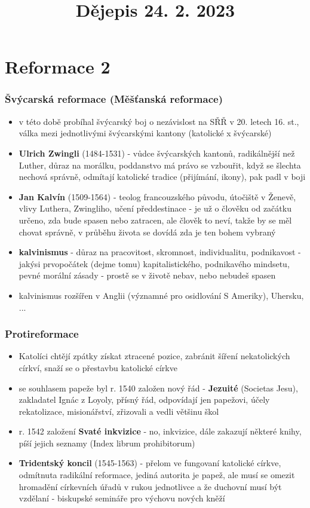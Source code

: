 \documentclass{article}
\title{\vspace{-2cm}Dějepis 24. 2. 2023\vspace{-1.7cm}}
\date{}
\author{}
\begin{document}
\maketitle

\part{Reformace 2}

\section{Švýcarská reformace (Měšťanská reformace)}
\begin{itemize}
  \item v této době probíhal švýcarský boj o nezávislost na SŘŘ v 20. letech 16. st., válka mezi jednotlivými švýcarskými kantony (katolické x švýcarské)
  \item \textbf{Ulrich Zwingli} (1484-1531) - vůdce švýcarských kantonů, radikálnější než Luther, důraz na morálku, poddanstvo má právo se vzbouřit, když se šlechta nechová správně, odmítají katolické tradice (přijímání, ikony), pak padl v boji
  \item \textbf{Jan Kalvín} (1509-1564) - teolog francouzského původu, útočiště v Ženevě, vlivy Luthera, Zwingliho, učení předdestinace - je už o člověku od začátku určeno, zda bude spasen nebo zatracen, ale člověk to neví, takže by se měl chovat správně, v průběhu života se dovídá zda je ten bohem vybraný
  \item \textbf{kalvinismus} - důraz na pracovitost, skromnost, individualitu, podnikavost - jakýsi prvopočátek (dejme tomu) kapitalistického, podnikavého mindsetu, pevné morální zásady - prostě se v životě nebav, nebo nebudeš spasen
  \item kalvinismus rozšířen v Anglii (významné pro osidlování S Ameriky), Uhersku, ...
\end{itemize}

\section{Protireformace}
\begin{itemize}
  \item Katolíci chtějí zpátky získat ztracené pozice, zabránit šíření nekatolických církví, snaží se o přestavbu katolické církve
  \item se souhlasem papeže byl r. 1540 založen nový řád - \textbf{Jezuité} (Societas Jesu), zakladatel Ignác z Loyoly, přísný řád, odpovídají jen papežovi, účely rekatolizace, misionářství, zřizovali a vedli většinu škol
  \item r. 1542 založení \textbf{Svaté inkvizice} - no, inkvizice, dále zakazují některé knihy, píší jejich seznamy (Index librum prohibitorum)
  \item \textbf{Tridentský koncil} (1545-1563) - přelom ve fungovaní katolické církve, odmítnuta radikální reformace, jediná autorita je papež, ale musí se omezit hromadění církevních úřadů v rukou jednotlivce a že duchovní musí být vzdělaní - biskupské semináře pro výchovu nových kněží
\end{itemize}
\end{document}

